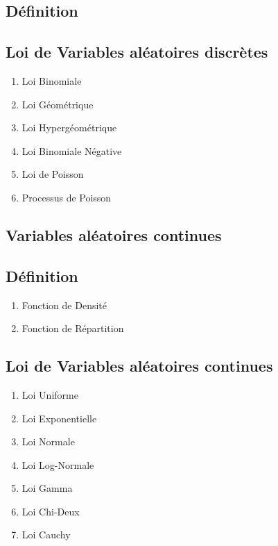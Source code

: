 \documentclass{article}
\begin{document}
\subsection{Définition}

\subsection{Loi de Variables aléatoires discrètes}

\begin{enumerate}
    \item Loi Binomiale
    \item Loi Géométrique
    \item Loi Hypergéométrique
    \item Loi Binomiale Négative
    \item Loi de Poisson
    \item Processus de Poisson
\end{enumerate}

\subsection{Variables aléatoires continues}

\subsection{Définition}

\begin{enumerate}
    \item Fonction de Densité
    \item Fonction de Répartition
\end{enumerate}

\subsection{Loi de Variables aléatoires continues}

\begin{enumerate}
    \item Loi Uniforme
    \item Loi Exponentielle
    \item Loi Normale
    \item Loi Log-Normale
    \item Loi Gamma
    \item Loi Chi-Deux
    \item Loi Cauchy
\end{enumerate}
\end{document}
